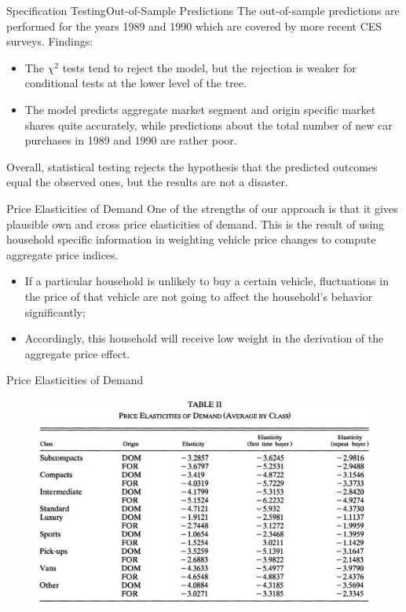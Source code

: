 \documentclass{beamer}
\begin{document}
\begin{frame}{Specification Testing}{Out-of-Sample Predictions}
	The out-of-sample predictions are performed for the years 1989 and 1990 which are covered by more recent CES surveys. Findings:
	\begin{itemize}
		\item The $\chi^2$ tests tend to reject the model, but the rejection is weaker for conditional tests at the lower level of the tree.
		\item The model predicts aggregate market segment and origin specific market shares quite accurately, while predictions about the total number of new car purchases in 1989 and 1990 are rather poor.
	\end{itemize}
	Overall, statistical testing rejects the hypothesis that the predicted outcomes equal the observed ones, but the results are not a disaster.
\end{frame}
\begin{frame}{Price Elasticities of Demand}
	One of the strengths of our approach is that it gives plausible own and cross price elasticities of demand. This is the result of using household specific information in weighting vehicle price changes to compute aggregate price indices.
	\begin{itemize}
		\item If a particular household is unlikely to buy a certain vehicle, fluctuations in the price of that vehicle are not going to affect the household's behavior significantly;
		\item Accordingly, this household will receive low weight in the derivation of the aggregate price effect.
	\end{itemize}
\end{frame}
\begin{frame}{Price Elasticities of Demand}
	\begin{figure}[h]
		\centering
		\includegraphics[scale=0.37]{table_2.png}
	\end{figure}
\end{frame}
\end{document}
